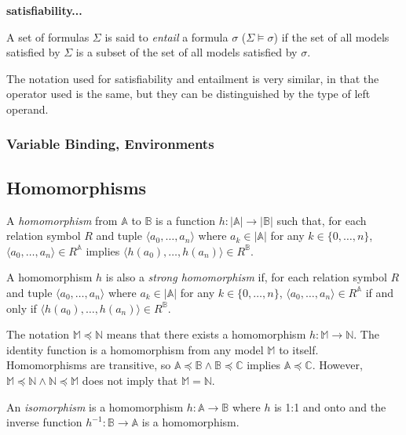 			\textbf{satisfiability...}

			A set of formulas $\Sigma$ is said to \emph{entail} a formula
			$\sigma$ ($\Sigma \models \sigma$) if the set of all models
			satisfied by $\Sigma$ is a subset of the set of all models
			satisfied by $\sigma$.

			The notation used for satisfiability and entailment is very
			similar, in that the operator used is the same, but they can be
			distinguished by the type of left operand.

		\subsubsection{Variable Binding, Environments}

			


	\subsection{Homomorphisms}

		A \emph{homomorphism} from $\mathbb{A}$ to $\mathbb{B}$ is a function
		$h: |\mathbb{A}|\to|\mathbb{B}|$ such that, for each relation symbol
		$R$ and tuple $\langle a_0 , \ldots , a_n \rangle$ where $a_k \in
		|\mathbb{A}|$ for any $k \in \{0 , \ldots , n\}$, $\langle a_0 , \ldots
		, a_n  \rangle \in R^\mathbb{A}$ implies $\langle h(a_0) , \ldots ,
		h(a_n)  \rangle \in R^\mathbb{B}$.

		A homomorphism $h$ is also a \emph{strong homomorphism} if, for each
		relation symbol $R$ and tuple $\langle a_0 , \ldots , a_n \rangle$
		where $a_k \in |\mathbb{A}|$ for any $k \in \{0 , \ldots , n\}$,
		$\langle a_0 , \ldots , a_n  \rangle \in R^\mathbb{A}$ if and only if
		$\langle h(a_0) , \ldots , h(a_n)  \rangle \in R^\mathbb{B}$.

		The notation $\mathbb{M} \preceq \mathbb{N}$ means that there exists a
		homomorphism $h : \mathbb{M} \to \mathbb{N}$. The identity function is
		a homomorphism from any model $\mathbb{M}$ to itself.  Homomorphisms
		are transitive, so $\mathbb{A} \preceq \mathbb{B} \wedge \mathbb{B}
		\preceq \mathbb{C}$ implies $\mathbb{A} \preceq \mathbb{C}$. However,
		$\mathbb{M} \preceq \mathbb{N} \wedge \mathbb{N} \preceq \mathbb{M}$
		does not imply that $\mathbb{M} = \mathbb{N}$.

		An \emph{isomorphism} is a homomorphism $h : \mathbb{A} \to \mathbb{B}$
		where $h$ is 1:1 and onto and the inverse function $h^{-1} : \mathbb{B}
		\to \mathbb{A}$ is a homomorphism.

